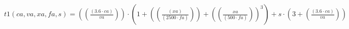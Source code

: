 \documentclass[preview,border=1pt]{standalone}
\begin{document}
$
t1 (ca,va,xa,fa,s) = \left(\left(\frac{\left(\num{3.6}\cdot ca\right)}{va}\right)\right)\cdot \left(\num{1}+\left(\left(\frac{\left(xa\right)}{\left(\num{2500}\cdot fa\right)}\right)\right)+\left(\left(\frac{xa}{\left(\num{500}\cdot fa\right)}\right)\right)^{\num{3}}\right)+s\cdot \left(\num{3}+\left(\frac{\left(\num{3.6}\cdot ca\right)}{va}\right)\right)
$
\end{document}

